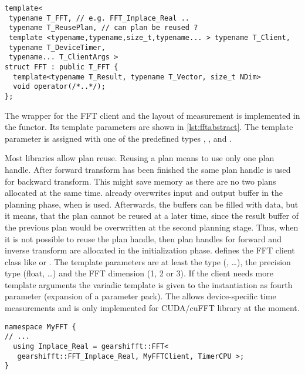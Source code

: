 \begin{lstlisting}[caption={FFT wrapper class},label={lst:fftabstract}]
template<
 typename T_FFT, // e.g. FFT_Inplace_Real ..
 typename T_ReusePlan, // can plan be reused ?
 template <typename,typename,size_t,typename... > typename T_Client,
 typename T_DeviceTimer,
 typename... T_ClientArgs >
struct FFT : public T_FFT {
  template<typename T_Result, typename T_Vector, size_t NDim>
  void operator(/*..*/);
};
\end{lstlisting}

The wrapper for the FFT client and the layout of measurement is implemented in the  functor.
Its template parameters are shown in \cref{lst:fftabstract}. 
The template parameter  is assigned with one of the predefined types , ,  and .

Most libraries allow plan reuse.
Reusing a plan means to use only one plan handle. After forward transform has been finished the same plan handle is used for backward transform.
This might save memory as there are no two plans allocated at the same time. \fftw{} already overwrites input and output buffer in the planning phase, when  is used. Afterwards, the buffers can be filled with data, but it means, that the plan cannot be reused at a later time, since the result buffer of the previous plan would be overwritten at the second planning stage.
Thus, when it is not possible to reuse the plan handle, then plan handles for forward and inverse transform are allocated in the initialization phase.
%
 defines the FFT client class like  or .
The template parameters are at least the  type (, \ldots), the precision type (float, \ldots) and the FFT dimension (1, 2 or 3). 
If the client needs more template arguments the variadic template  is given to the  instantiation as fourth parameter (expansion of a parameter pack).
The  allows device-specific time measurements and is only implemented for CUDA/cuFFT library at the moment.

\begin{lstlisting}[caption={Define FFT client types for corresponding FFTs},label={lst:implfftusing}]
namespace MyFFT { 
// ...
  using Inplace_Real = gearshifft::FFT<
   gearshifft::FFT_Inplace_Real, MyFFTClient, TimerCPU >;
}
\end{lstlisting}

